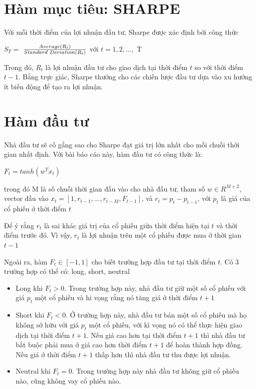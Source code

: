 \documentclass[14pt]{extreport}
\begin{document}
\section{Hàm mục tiêu: SHARPE}

Với mỗi thời điểm của lợi nhuận đầu tư, Sharpe được xác định bởi công thức


\begin{center}
$ S_T=$ {\Large $\frac{Average(R_t)}{Standard \hspace{0.1cm}  Deviation (R_t)}$} với $t =1,2,...,$ T  
\end{center}


Trong đó, $R_t$ là lợi nhuận đầu tư cho giao dịch tại thời điểm $t$ so với thời điểm $t-1$. Bằng trực giác, Sharpe thưởng cho các chiến lược đầu tư dựa vào xu hướng ít biến động để tạo ra lợi nhuận.

\section{Hàm đầu tư}

Nhà đầu tư sẽ cố gắng sao cho Sharpe đạt giá trị lớn nhất cho mỗi chuỗi thời gian nhất định. Với bài báo cáo này, hàm đầu tư có công thức là:

\begin{center}
$F_t = tanh(w^T x_t)$
\end{center}

trong đó M là số chuỗi thời gian đầu vào cho nhà đầu tư, tham số $w \in R^{M+2}$, vector đầu vào $x_t=[1,r_{t-1},...,r_{t-M},F_{t-1}]$, và $r_t=p_t - p_{t-1}$, với $p_t$ là giá của cổ phiếu ở thời điểm $t$

Để ý rằng $r_t$ là sai khác giá trị của cổ phiếu giữa thời điểm hiện tại $t$ và thời điểm trước đó. Vì vậy, $r_t$ là lợi nhuận trên một cổ phiếu được mua ở thời gian $t-1$

Ngoài ra, hàm $F_t \in [-1,1]$ cho biết trường hợp đầu tư tại thời điểm $t$. Có 3 trường hợp có thể có: long, short, neutral
\begin{itemize}
\item Long khi $F_t > 0$. Trong trường hợp này, nhà đầu tư giữ một số cổ phiếu với giá $p_t$ một cổ phiếu và hi vọng rằng nó tăng giá ở thời điểm $t+1$
\item Short khi $F_t <0$. Ở trường hợp này, nhà đầu tư bán một số cổ phiếu mà họ không sở hữu với giá $p_t$ một cổ phiếu, với kì vọng nó có thể thực hiện giao dịch tại thời điểm $t+1$. Nếu giá cao hơn tại thời điểm $t+1$ thì nhà đầu tư bắt buộc phải mua ở giá cao hơn thời điểm $t+1$ để hoàn thành hợp đồng. Nếu giá ở thời điểm $t+1$ thấp hơn thì nhà đầu tư thu được lợi nhuận.
\item Neutral khi $F_t=0$. Trong trường hợp này nhà đầu tư không giữ cổ phiếu nào, cũng không vay cổ phiếu nào.
\end{itemize}
\end{document}

